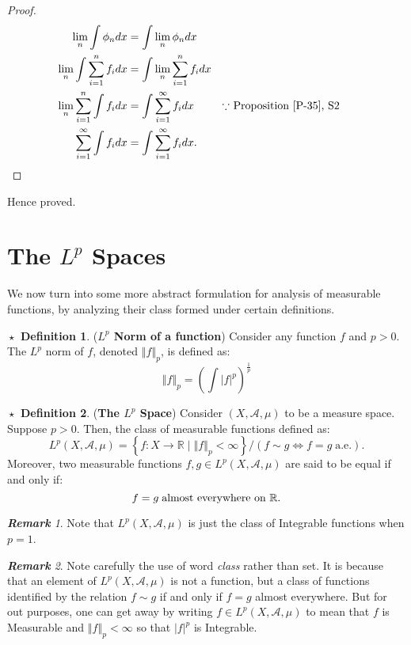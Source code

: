 \documentclass{article}
\theoremstyle{definition}
\newtheorem{definition}{$\boxed{\star}$ Definition}
\theoremstyle{remark}
\newtheorem*{remark}{\textbf{Remark}}
\theoremstyle{definition}
\theoremstyle{definition}
\theoremstyle{definition}
\newcommand{\abs}[1]{\left \vert #1\right \vert}
\newcommand{\norm}[1]{\left \Vert #1 \right \Vert}
\newcommand{\where}{\;\vert\;}
\newcommand{\R}{\mathbb{R}}
\newcommand{\alg}[1]{\mathscr{#1}}
\newcommand{\Lp}[1]{L^{p}\left (#1\right )}
\newcommand{\wnorm}[2]{\left (\int \abs{#2}^{#1}\right )^{\frac{1}{#1}}}
\begin{document}
\begin{proof}
	\begin{align*}
		\lim_n \int \phi_n dx &= \int \lim_{n}\phi_n dx\\
		\lim_{n} \int \sum_{i=1}^{n} f_i dx&= \int \lim_{n} \sum_{i=1}^{n} f_i dx\\
		\lim_{n}\sum_{i=1}^{n}\int f_i dx &= \int \sum_{i=1}^{\infty} f_i dx&&\text{$ \because $ Proposition \ref{P-35}, S2 }\\
		\sum_{i=1}^{\infty} \int f_i dx &= \int \sum_{i=1}^{\infty} f_i dx.
	\end{align*}
\end{proof}
Hence proved.

\hrulefill
\newpage
\section{The $ L^{p}$ Spaces}
We now turn into some more abstract formulation for analysis of measurable functions, by analyzing their class formed under certain definitions.
\begin{definition}
	(\textbf{$ L^{p} $ Norm of a function}) Consider any function $ f $ and $ p>0 $. The $ L^{p} $ norm of $ f $, denoted $ \norm{f}_p $, is defined as:
	\[\norm{f}_p = \wnorm{p}{f}\]
\end{definition}
\hrulefill
\begin{definition}
	(\textbf{The $ L^{p}$ Space}) Consider $ (X,\alg{A},\mu) $ to be a measure space. Suppose $ p> 0 $. Then, the class of measurable functions defined as:
	\[\Lp{X,\alg{A},\mu} = \left \{f : X \to \R \where \norm{f}_p < \infty \right \}/(f\sim g \iff f=g\;\text{a.e.}).\]
	Moreover, two measurable functions $ f,g \in \Lp{X,\alg{A},\mu} $ are said to be equal if and only if:
	\[f = g\;\text{almost everywhere on $ \R $.}\]
\end{definition}
\begin{remark}
	Note that $ \Lp{X,\alg{A},\mu} $ is just the class of Integrable functions when $ p=1 $.
\end{remark}
\begin{remark}
	Note carefully the use of word \emph{class} rather than set. It is because that an element of $ \Lp{X,\alg{A},\mu} $ is not a function, but a class of functions identified by the relation $ f \sim g $ if and only if $ f = g $ almost everywhere. But for out purposes, one can get away by writing $ f \in  \Lp{X,\alg{A},\mu} $ to mean that $ f $ is Measurable and $ \norm{f}_p < \infty $ so that $ \abs{f}^{p}$ is Integrable.
\end{remark}
\hrulefill
\end{document}
